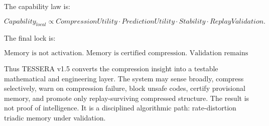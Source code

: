 \documentclass[12pt]{article}
\begin{document}
The capability law is:

\[
\boxed{
Capability_{local}\propto
CompressionUtility\cdot PredictionUtility\cdot Stability\cdot ReplayValidation.
}
\]

The final lock is:

\[
\boxed{
\text{Memory is not activation. Memory is certified compression. Validation remains reality.}
}
\]

Thus TESSERA v1.5 converts the compression insight into a testable mathematical
and engineering layer. The system may sense broadly, compress selectively, warn
on compression failure, block unsafe codes, certify provisional memory, and
promote only replay-surviving compressed structure. The result is not proof of
intelligence. It is a disciplined algorithmic path: rate-distortion triadic
memory under validation.
\end{document}
